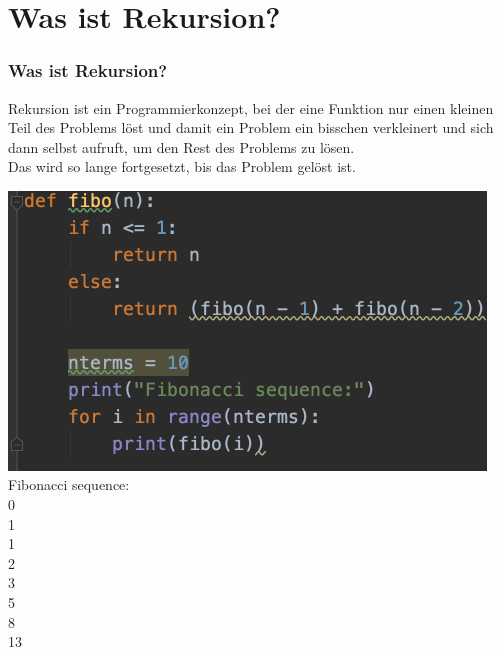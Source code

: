 \documentclass{beamer}
\begin{document}
\section{Was ist Rekursion?}
\begin{frame}
	\frametitle{Was ist Rekursion?} 
	\begin{minipage}{0.48\textwidth}
		Rekursion ist ein Programmierkonzept, bei der eine Funktion nur einen kleinen Teil des Problems löst und damit ein Problem ein bisschen verkleinert und sich dann selbst aufruft, um den Rest des Problems zu lösen.\\
		Das wird so lange fortgesetzt, bis das Problem gelöst ist.
	\end{minipage}
	\begin{minipage}{0.48\textwidth}
	\centering
	\includegraphics[width=0.95\textwidth]{img/fibo.png}
	\flushleft
	\noindent \hspace*{5mm} Fibonacci sequence:\\
	\noindent \hspace*{5mm} 0\\
	\noindent \hspace*{5mm} 1\\
	\noindent \hspace*{5mm} 1\\
	\noindent \hspace*{5mm} 2\\
	\noindent \hspace*{5mm} 3\\
	\noindent \hspace*{5mm} 5\\
	\noindent \hspace*{5mm} 8\\
	\noindent \hspace*{5mm} 13\\
	\end{minipage}
\end{frame}
\end{document}
